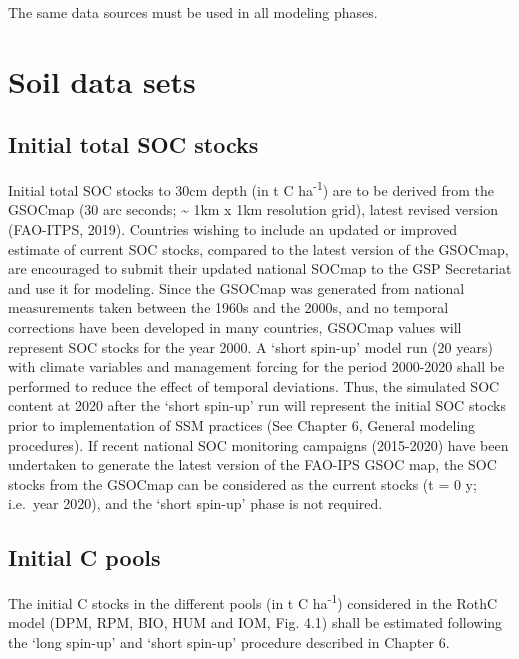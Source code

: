 \documentclass[
  10pt,
  b5paper,
]{book}
\begin{document}
The same data sources must be used in all modeling phases.

\hypertarget{soil-data-sets}{%
\section{Soil data sets}\label{soil-data-sets}}

\hypertarget{initial-total-soc-stocks}{%
\subsection{Initial total SOC stocks}\label{initial-total-soc-stocks}}

Initial total SOC stocks to 30cm depth (in t C ha\textsuperscript{-1}) are to be derived from the GSOCmap (30 arc seconds; \textasciitilde{} 1km x 1km resolution grid), latest revised version (FAO-ITPS, 2019). Countries wishing to include an updated or improved estimate of current SOC stocks, compared to the latest version of the GSOCmap, are encouraged to submit their updated national SOCmap to the GSP Secretariat and use it for modeling.
Since the GSOCmap was generated from national measurements taken between the 1960s and the 2000s, and no temporal corrections have been developed in many countries, GSOCmap values will represent SOC stocks for the year 2000. A `short spin-up' model run (20 years) with climate variables and management forcing for the period 2000-2020 shall be performed to reduce the effect of temporal deviations. Thus, the simulated SOC content at 2020 after the `short spin-up' run will represent the initial SOC stocks prior to implementation of SSM practices (See Chapter 6, General modeling procedures). If recent national SOC monitoring campaigns (2015-2020) have been undertaken to generate the latest version of the FAO-IPS GSOC map, the SOC stocks from the GSOCmap can be considered as the current stocks (t = 0 y; i.e.~year 2020), and the `short spin-up' phase is not required.

\hypertarget{initial-c-pools}{%
\subsection{Initial C pools}\label{initial-c-pools}}

The initial C stocks in the different pools (in t C ha\textsuperscript{-1}) considered in the RothC model (DPM, RPM, BIO, HUM and IOM, Fig. 4.1) shall be estimated following the `long spin-up' and `short spin-up' procedure described in Chapter 6.
\end{document}
